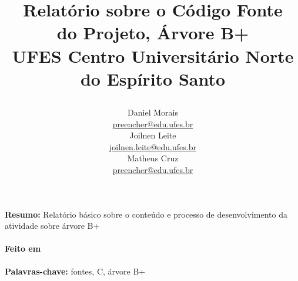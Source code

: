 \documentclass [a4paper, 12pt] {article}
\begin{document}
\normalfont

\title {
    \Large{\textbf{Relatório sobre o Código Fonte}} \\
    \Large{\textbf{do Projeto, Árvore B+}} \\
    \large {UFES Centro Universitário Norte do Espírito Santo}
    \author{
        \small
        Daniel Morais \\ \href{mailto:preencher@edu.ufes.br}
        {\small \color{blue}preencher@edu.ufes.br} \\
        \small
        Joilnen Leite \\ \href{mailto:joilnen.leite@edu.ufes.br}
        {\small \color{blue}joilnen.leite@edu.ufes.br} \\
        \small
        Matheus Cruz \\ \href{mailto:preencher@edu.ufes.br}
        {\small \color{blue}preencher@edu.ufes.br}
    }
    \date{}
} 
\maketitle 

\noindent \textbf{Resumo: } Relatório básico sobre o conteúdo e processo de desenvolvimento 
da atividade sobre árvore B+ \\
\ \\
\noindent \textbf{Feito em}   \\
\ \\
\noindent \textbf{Palavras-chave: } fontes, C, árvore B+ \\
\small
\end{document}
